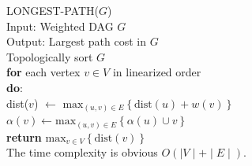 LONGEST-PATH($G$)\\
Input: Weighted DAG $G$\\
Output: Largest path cost in $G$\\
Topologically sort $G$\\
\textbf{for} each vertex $v \in V$ in linearized order\\
\hspace*{0.6cm} \textbf{do}:\\
\hspace*{0.6cm} dist($v$) $\gets$ $\text{max}_{(u, v) \in E}\left\{ \text{dist}(u) + w(v) \right\}$\\
\hspace*{0.6cm} $\alpha(v) \gets \text{max}_{(u, v) \in E}\left\{ \alpha(u) \cup v \right\}$\\
\textbf{return} $\text{max}_{v \in V} \left\{ \text{dist}(v) \right\}$\\

The time complexity is obvious $O(\mid V \mid + \mid E \mid)$.

